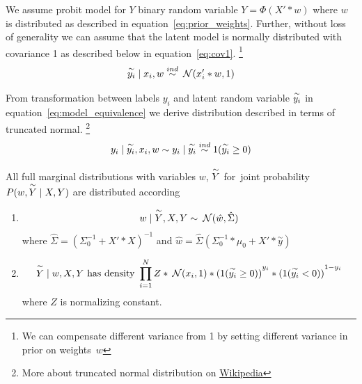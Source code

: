 We assume probit model for $Y$ binary random variable $ Y = \Phi(X' * w)$ where $w$ is distributed as described in equation~\ref{eq:prior_weights}.
Further, without loss of generality we can assume that the latent model is normally distributed with covariance 1 as described below in equation~\ref{eq:cov1}.
\footnote{We can compensate different variance from 1 by setting different variance in prior on weights~$w$ }
\begin{equation}\label{eq:cov1}
    \overset{\sim}{y_i} \mid x_i, w \overset{ind}{\sim} \:\mathcal{N}(x_i' * w, 1)
\end{equation}

From transformation between labels $y_i$ and latent random variable $\overset{\sim}{y_i}$ in equation~\ref{eq:model_equivalence} we derive distribution described in terms of truncated normal.
\footnote{More about truncated normal distribution on \href{http://en.wikipedia.org/wiki/Truncated_normal_distribution}{Wikipedia}}
\begin{equation}
    y_i \mid \overset{\sim}{y_i}, x_i, w \sim y_i \mid \overset{\sim}{y_i} \overset{ind}{\sim} 1(\overset{\sim}{y_i} \ge 0)
\end{equation}

\begin{thm}
    All full marginal distributions with variables $w$, $\overset{\sim}{Y}$ for~joint probability $P(w, \overset{\sim}{Y} \mid X, Y)$ are distributed according
\begin{enumerate}
\item
    \begin{equation}\label{eq:margin_w}
    w \mid \overset{\sim}{Y}, X, Y \sim \:\mathcal{N}(\hat{w},\hat{\Sigma})
    \end{equation} 
    where 
    $ \hat{\Sigma} = {(\Sigma_0^{-1} + X' * X)}^{-1} $ 
    and
    $ \hat{w} = \hat{\Sigma} ( \Sigma_0^{-1}*\mu_0 + X' * \overset{\sim}{y} ) $

\item 
    \begin{equation}\label{eq:margin_ytilda}
        \overset{\sim}{Y} \mid w, X, Y \text{ has density } \\
        \prod_{i=1}^{N} Z * \:\mathcal{N}(x_i, 1) * {(1(\overset{\sim}{y_i} \ge 0))}^{y_i} * {(1(\overset{\sim}{y_i} < 0))}^{1-y_i}
    \end{equation} 
    where $Z$ is normalizing constant.
\end{enumerate}
\end{thm}

